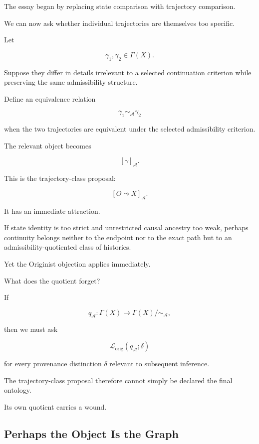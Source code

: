 \documentclass[
  11pt,
  a4paper,
  DIV=12,
  BCOR=0mm,
  parskip=half-
]{scrartcl}
\newcommand{\Adm}{\mathcal A}
\newcommand{\lossorig}{%
  \mathscr L_{\mathrm{orig}}%
}
\theoremstyle{definition}
\theoremstyle{plain}
\theoremstyle{remark}
\begin{document}
The essay began by replacing state comparison with trajectory comparison.

We can now ask whether individual trajectories are themselves too specific.

Let

\[
  \gamma_1,\gamma_2\in\Gamma(X).
\]

Suppose they differ in details irrelevant to a selected continuation criterion
while preserving the same admissibility structure.

Define an equivalence relation

\[
  \gamma_1\sim_{\Adm}\gamma_2
\]

when the two trajectories are equivalent under the selected admissibility
criterion.

The relevant object becomes

\[
  [\gamma]_{\Adm}.
\]

This is the trajectory-class proposal:

\[
  [O\leadsto X]_{\Adm}.
\]

It has an immediate attraction.

If state identity is too strict and unrestricted causal ancestry too weak,
perhaps continuity belongs neither to the endpoint nor to the exact path but
to an admissibility-quotiented class of histories.

Yet the Originist objection applies immediately.

What does the quotient forget?

If

\[
  q_{\Adm}:
  \Gamma(X)
  \rightarrow
  \Gamma(X)/{\sim_{\Adm}},
\]

then we must ask

\[
  \lossorig(q_{\Adm};\delta)
\]

for every provenance distinction \(\delta\) relevant to subsequent inference.

The trajectory-class proposal therefore cannot simply be declared the final
ontology.

Its own quotient carries a wound.


\subsection{Perhaps the Object Is the Graph}
\label{sec:perhaps-graph}
\end{document}
